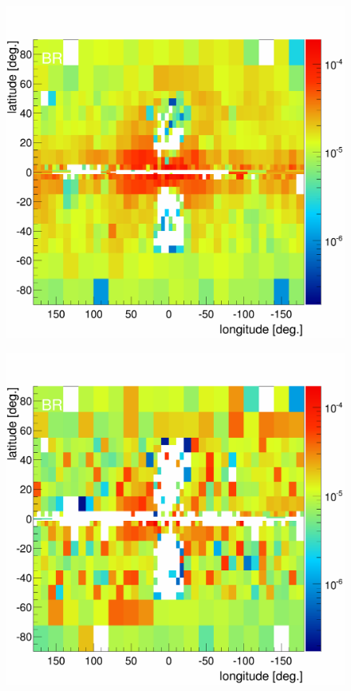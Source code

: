 \begin{figure}[h]
  \centering
  \begin{minipage}[h]{0.3\textwidth}
  	\centering
	\includegraphics[width=1.\linewidth]{pic/discussion/MCRonly_BR_integral_flux.png}
  	\label{}
  \end{minipage}
  \hfill
  \begin{minipage}[h]{0.3\textwidth}
	  \centering
	  \includegraphics[width=1.\linewidth]{pic/discussion/DMonly_BR_integral_flux.png}

\end{minipage}
\end{figure}
